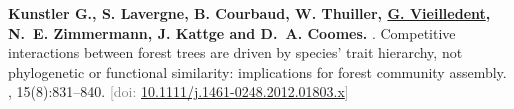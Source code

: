 \documentclass[10pt,a4paper,sans]{moderncv}
\newcounter{enumiv_gv}
\begin{document}
\begin{thebibliography}{5}
\setcounter{enumiv}{0}
\textbf{Kunstler G., S. Lavergne, B. Courbaud, W. Thuiller,
  \underline{G. Vieilledent}, N.~E. Zimmermann, J. Kattge and D.~A. Coomes.}
.
\newblock Competitive interactions between forest trees are driven by species'
  trait hierarchy, not phylogenetic or functional similarity: implications for
  forest community assembly.
, 15(8):831--840.
\newblock \textcolor{gray}{[doi: \href{https://doi.org/10.1111/j.1461-0248.2012.01803.x}{10.1111/j.1461-0248.2012.01803.x}]}

\end{thebibliography}
\end{document}
